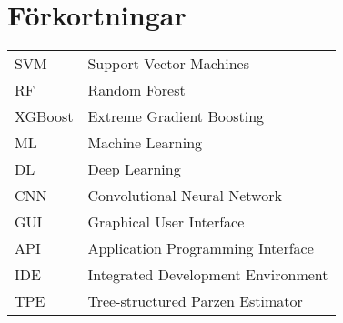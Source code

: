 \documentclass[12pt,a4paper]{article}
\begin{document}
\section*{Förkortningar}
\begin{tabular}{ll}
    SVM & Support Vector Machines \\
    RF & Random Forest \\
    XGBoost & Extreme Gradient Boosting \\
    ML & Machine Learning \\
    DL & Deep Learning \\
    CNN & Convolutional Neural Network \\
    GUI & Graphical User Interface \\
    API & Application Programming Interface \\
    IDE & Integrated Development Environment \\
    TPE & Tree-structured Parzen Estimator \\

\end{tabular}

\newpage

\listoffigures

\newpage

\listoftables

\newpage

\newpage
\tableofcontents
\end{document}
